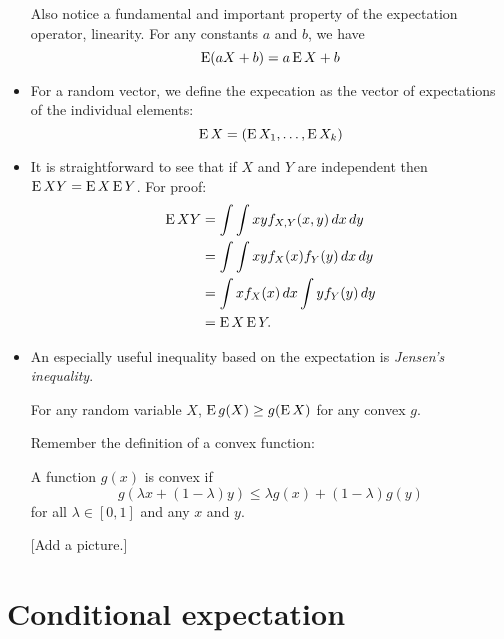\begin{itemize}
  Also notice a fundamental and important property of the expectation
  operator, linearity.  For any constants $a$ and $b$, we have
  \begin{equation*}
    \operatorname{E}(a X + b) = a \operatorname{E} X + b
  \end{equation*}

\item For a random vector, we define the expecation as the vector of
  expectations of the individual elements:
  \begin{equation*}
    \operatorname{E} X = (\operatorname{E} X_1,\dots,\operatorname{E} X_k)
  \end{equation*}

\item It is straightforward to see that if $X$ and $Y$ are
  independent then $\operatorname{E} XY = \operatorname{E} X \operatorname{E} Y$.  For proof:
  \begin{align*}
    \operatorname{E} XY
    &= \int\int x y f_{X,Y}(x,y) \,dx \,dy \\
    &= \int\int xy f_X(x) f_Y(y) \,dx \,dy \\
    &= \int x f_X(x) \,dx \int y f_Y(y) \,dy \\
    &= \operatorname{E} X \operatorname{E} Y.
  \end{align*}

\item An especially useful inequality based on the expectation is
  \emph{Jensen's inequality}.
  \begin{thm}
    For any random variable $X$, $\operatorname{E} g(X) \geq g(\operatorname{E} X)$ for any convex
    $g$.
  \end{thm}

  Remember the definition of a convex function:
  \begin{defn}
    A function $g(x)$ is convex if 
    \begin{equation*}
      g( \lambda x + (1-\lambda) y ) \leq \lambda g(x) + (1-\lambda) g(y) 
    \end{equation*}
    for all $\lambda \in [0,1]$ and any $x$ and $y$.
  \end{defn}

  [Add a picture.]

\end{itemize}

\section{Conditional expectation}

